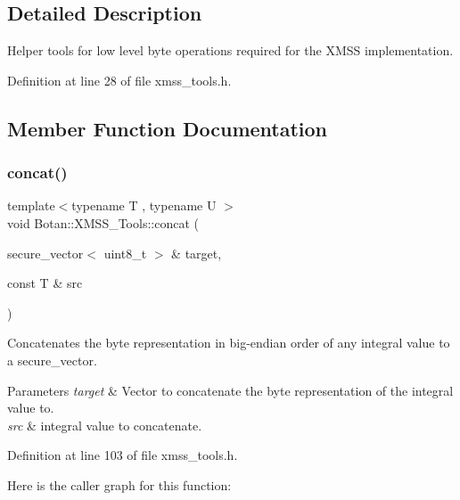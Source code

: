 \subsection{Detailed Description}
Helper tools for low level byte operations required for the X\+M\+SS implementation. 

Definition at line 28 of file xmss\+\_\+tools.\+h.



\subsection{Member Function Documentation}
\mbox{\label{class_botan_1_1_x_m_s_s___tools_add86e0bedfc6b9995c4d04dbe1ac8a2d}} 
\subsubsection{\texorpdfstring{concat()}{concat()}\hspace{0.1cm}{\footnotesize\ttfamily [1/2]}}
{\footnotesize\ttfamily template$<$typename T , typename U $>$ \\
void Botan\+::\+X\+M\+S\+S\+\_\+\+Tools\+::concat (\begin{DoxyParamCaption}\item[{secure\+\_\+vector$<$ uint8\+\_\+t $>$ \&}]{target,  }\item[{const T \&}]{src }\end{DoxyParamCaption})\hspace{0.3cm}{\ttfamily [static]}}

Concatenates the byte representation in big-\/endian order of any integral value to a secure\+\_\+vector.


\begin{DoxyParams}{Parameters}
{\em target} & Vector to concatenate the byte representation of the integral value to. \\
\hline
{\em src} & integral value to concatenate. \\
\hline
\end{DoxyParams}


Definition at line 103 of file xmss\+\_\+tools.\+h.

Here is the caller graph for this function\+:
\mbox{\label{class_botan_1_1_x_m_s_s___tools_abe515ea4b81739fc09a6ca36c0487917}} 
